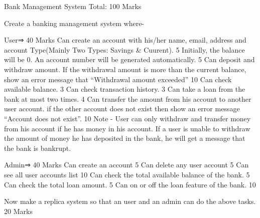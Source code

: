 Bank Management System
Total: 100 Marks


Create a banking management system where-

User⇒                                                                                          40 Marks
Can create an account with his/her name, email, address and account Type(Mainly Two Types: Savings & Cuurent).	    5
Initially, the balance will be 0. An account number will be generated automatically. 									    5
Can deposit and withdraw amount. If the withdrawal amount is more than the current balance, show an error message that “Withdrawal amount exceeded” 										    10
Can check available balance.                                                                   3
Can check transaction history.                                                                  3
Can take a loan from the bank at most two times.                                    4
Can transfer the amount from his account to another user account. if the other account does not exist then show an error message “Account does not exist”.                                                                                                10
Note - User can only withdraw and transfer money from his account if he has money in his account.
If a user is unable to withdraw the amount of money he has deposited in the bank, he will get a message that the bank is bankrupt.

Admin⇒                                                                                                                              40 Marks
Can create an account                                                                        5
Can delete any user account                                                              5
Can see all user accounts list                                                            10
Can check the total available balance of the bank.                            5
Can check the total loan amount.                                                       5
Can on or off the loan feature of the bank.                                        10

Now make a replica system so that an user and an admin can do the above tasks.                                                                                               20 Marks

